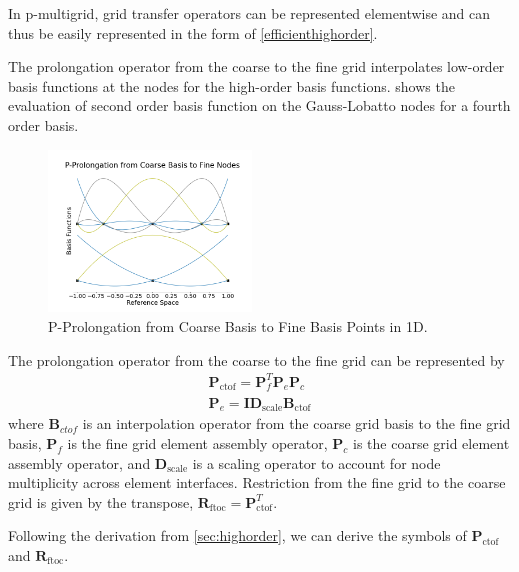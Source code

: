 \documentclass[review]{siamart190516}
\begin{document}
In p-multigrid, grid transfer operators can be represented elementwise and can thus be easily represented in the form of \cref{efficienthighorder}.

The prolongation operator from the coarse to the fine grid interpolates low-order basis functions at the nodes for the high-order basis functions.
 shows the evaluation of second order basis function on the Gauss-Lobatto nodes for a fourth order basis.

\begin{figure}[!ht]
  \centering
  \includegraphics[width=0.48\textwidth]{img/pProlongation}
  \caption{P-Prolongation from Coarse Basis to Fine Basis Points in 1D.}
  \label{fig:p_prolongation}
\end{figure}

The prolongation operator from the coarse to the fine grid can be represented by
\begin{equation}
\begin{split}
\mathbf{P}_{\text{ctof}} = \mathbf{P}_f^T \mathbf{P}_e \mathbf{P}_c\\
\mathbf{P}_e = \mathbf{I} \mathbf{D}_{\text{scale}} \mathbf{B}_{\text{ctof}}
\end{split}
\end{equation}
where $\mathbf{B}_{ctof}$ is an interpolation operator from the coarse grid basis to the fine grid basis, $\mathbf{P}_f$ is the fine grid element assembly operator, $\mathbf{P}_c$ is the coarse grid element assembly operator, and $\mathbf{D}_{\text{scale}}$ is a scaling operator to account for node multiplicity across element interfaces.
Restriction from the fine grid to the coarse grid is given by the transpose, $\mathbf{R}_{\text{ftoc}} = \mathbf{P}_{\text{ctof}}^T$.

Following the derivation from \cref{sec:highorder}, we can derive the symbols of $\mathbf{P}_{\text{ctof}}$ and $\mathbf{R}_{\text{ftoc}}$.
\end{document}
